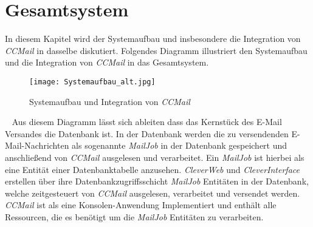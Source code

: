 \chapter{Gesamtsystem}
\label{cha:gesamtsystem}
In diesem Kapitel wird der Systemaufbau und insbesondere die Integration von \emph{CCMail} in dasselbe diskutiert.
Folgendes Diagramm illustriert den Systemaufbau und die Integration von \emph{CCMail} in das Gesamtsystem. 
\\
\begin{figure}[h]
\centering
\texttt{[image: Systemaufbau\_alt.jpg]} %
\caption{Systemaufbau und Integration von \emph{CCMail}}
\label{fig:ccmail-system-integration}
\end{figure}
\ \newline
Aus diesem Diagramm lässt sich ableiten dass das Kernstück des E-Mail Versandes die Datenbank ist. In der Datenbank werden die zu versendenden E-Mail-Nachrichten als sogenannte \emph{MailJob} in der Datenbank gespeichert und anschließend von \emph{CCMail} ausgelesen und verarbeitet. Ein \emph{MailJob} ist hierbei als eine Entität einer Datenbanktabelle anzusehen.
\newline\newline
\emph{CleverWeb} und \emph{CleverInterface} erstellen über ihre Datenbankzugriffsschicht \emph{MailJob} Entitäten in der Datenbank, welche zeitgesteuert von \emph{CCMail} ausgelesen, verarbeitet und versendet werden. \emph{CCMail} ist als eine Konsolen-Anwendung Implementiert und enthält alle Ressourcen, die es benötigt um die \emph{MailJob} Entitäten zu verarbeiten.

